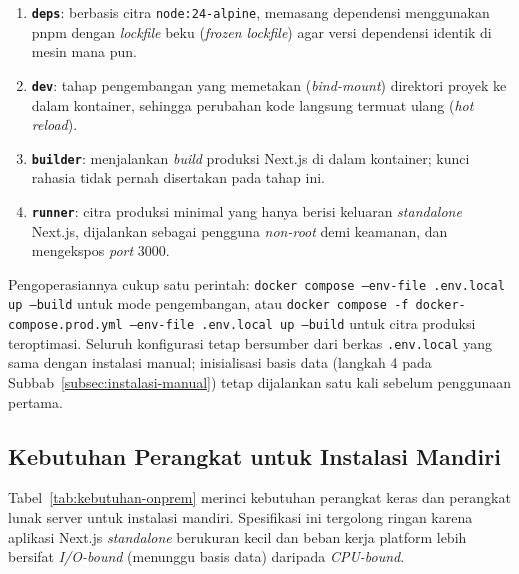 \begin{enumerate}[leftmargin=2cm]
  \item \textbf{\texttt{deps}}: berbasis citra \texttt{node:24-alpine}, memasang dependensi menggunakan pnpm dengan \textit{lockfile} beku (\textit{frozen lockfile}) agar versi dependensi identik di mesin mana pun.
  \item \textbf{\texttt{dev}}: tahap pengembangan yang memetakan (\textit{bind-mount}) direktori proyek ke dalam kontainer, sehingga perubahan kode langsung termuat ulang (\textit{hot reload}).
  \item \textbf{\texttt{builder}}: menjalankan \textit{build} produksi Next.js di dalam kontainer; kunci rahasia tidak pernah disertakan pada tahap ini.
  \item \textbf{\texttt{runner}}: citra produksi minimal yang hanya berisi keluaran \textit{standalone} Next.js, dijalankan sebagai pengguna \textit{non-root} demi keamanan, dan mengekspos \textit{port} 3000.
\end{enumerate}

Pengoperasiannya cukup satu perintah: \texttt{docker compose --env-file .env.local up --build} untuk mode pengembangan, atau \texttt{docker compose -f docker-compose.prod.yml --env-file .env.local up --build} untuk citra produksi teroptimasi. Seluruh konfigurasi tetap bersumber dari berkas \texttt{.env.local} yang sama dengan instalasi manual; inisialisasi basis data (langkah 4 pada Subbab~\ref{subsec:instalasi-manual}) tetap dijalankan satu kali sebelum penggunaan pertama.

\subsection{Kebutuhan Perangkat untuk Instalasi Mandiri}
\label{subsec:kebutuhan-onprem}

Tabel~\ref{tab:kebutuhan-onprem} merinci kebutuhan perangkat keras dan perangkat lunak server untuk instalasi mandiri. Spesifikasi ini tergolong ringan karena aplikasi Next.js \textit{standalone} berukuran kecil dan beban kerja platform lebih bersifat \textit{I/O-bound} (menunggu basis data) daripada \textit{CPU-bound}.

